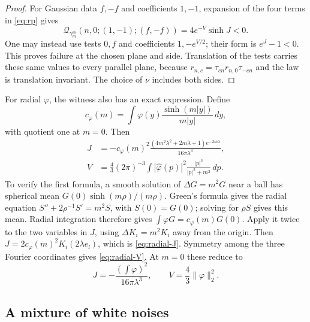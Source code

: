 \documentclass[11pt,letterpaper,reqno]{amsart}
\theoremstyle{definition}
\theoremstyle{remark}
\begin{document}
\begin{proof}
For Gaussian data $f,-f$ and coefficients $1,-1$, expansion of the
four terms in \eqref{eq:rp} gives
\begin{equation}\label{eq:gaussian-negative}
 \mathcal Q_{\gamma_m^\oplus}(n,0;(1,-1);(f,-f))
       =4e^{-V}\sinh J<0.
\end{equation}
One may instead use tests $0,f$ and coefficients $1,-e^{V/2}$;
their form is $e^J-1<0$. This proves failure at the chosen plane
and side. Translation of the tests carries these same values to
every parallel plane, because
$r_{n,c}=\tau_{cn}r_{n,0}\tau_{-cn}$ and the law is translation
invariant. The choice of $\nu$ includes both sides.
\end{proof}

For radial $\varphi$, the witness also has an exact expression.
Define
\[
 c_\varphi(m)=\int\varphi(y)\frac{\sinh(m|y|)}{m|y|}\,dy,
\]
with quotient one at $m=0$. Then
\begin{align}
 J&=-c_\varphi(m)^2
       \frac{(4m^2\lambda^2+2m\lambda+1)e^{-2m\lambda}}
            {16\pi\lambda^3},\label{eq:radial-J}\\
 V&=\frac43(2\pi)^{-3}\int|\widehat\varphi(p)|^2
                  \frac{|p|^2}{|p|^2+m^2}\,dp.
 \label{eq:radial-V}
\end{align}
To verify the first formula, a smooth solution of $\Delta G=m^2G$
near a ball has spherical mean
$G(0)\sinh(m\rho)/(m\rho)$. Green's formula gives the radial equation
$S''+2\rho^{-1}S'=m^2S$, with $S(0)=G(0)$; solving for $\rho S$
gives this mean. Radial integration therefore gives
$\int\varphi G=c_\varphi(m)G(0)$. Apply it twice to the two
variables in $J$, using $\Delta K_i=m^2K_i$ away from the origin.
Then $J=2c_\varphi(m)^2K_i(2\lambda e_l)$, which is
\eqref{eq:radial-J}. Symmetry among the three Fourier coordinates
gives \eqref{eq:radial-V}. At $m=0$ these reduce to
\[
 J=-\frac{(\int\varphi)^2}{16\pi\lambda^3},\qquad
 V=\frac43\|\varphi\|_2^2.
\]

\subsection{A mixture of white noises}
\end{document}
